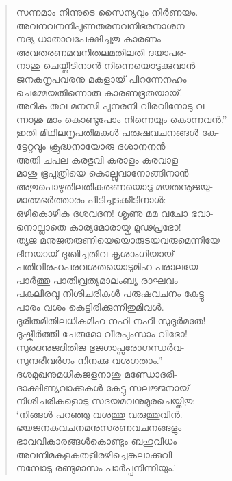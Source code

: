 \begin{verse}
സന്നമാം നിന്നുടെ സൈന്യവും നിര്‍ണയം.\\
അവനവനനിപുണതരനവനിഭരനാശന-\\
നദ്യ ധാതാവപേക്ഷിച്ചതു കാരണം\\
അവതരണമവനിതലമതിലതി ദയാപര-\\
നാശു ചെയ്തീടിനാന്‍ നിന്നെയൊടുക്കുവാന്‍\\
ജനകനൃപവരനു മകളായ് പിറന്നേനഹം\\
ചെമ്മേയതിന്നൊരു കാരണഭൂതയായ്.\\
അറിക തവ മനസി പുനരനി വിരവിനോടു വ-\\
ന്നാശു മാം കൊണ്ടുപോം നിന്നെയും കൊന്നവന്‍.”\\
ഇതി മിഥിലനൃപതിമകള്‍ പരുഷവചനങ്ങള്‍ കേ-\\
ട്ടേറ്റവും ക്രുദ്ധനായോരു ദശാനനന്‍\\
അതി ചപല കരഭുവി കരാളം കരവാള-\\
മാശു ഭൂപുത്രിയെ കൊല്ലുവാനോങ്ങിനാന്‍\\
അതുപൊഴുതിലതികരുണയൊടു മയതനൂജയു-\\
മാത്മഭര്‍ത്താരം പിടിച്ചടക്കീടിനാള്‍:\\
ഒഴികൊഴിക ദശവദന! ശൃണു മമ വചോ ഭവാ-\\
നൊല്ലാതെ കാര്യമോരായ്ക മൂഢപ്രഭോ!\\
ത്യജ മനുജതരുണിയെയൊരുടയവരുമെന്നിയേ\\
ദീനയായ് ദുഃഖിച്ചതീവ കൃശാംഗിയായ്\\
പതിവിരഹപരവശതയൊടുമിഹ പരാലയേ\\
പാര്‍ത്തു പാതിവ്രത്യമാലംബ്യ രാഘവം\\
പകലിരവു നിശിചരികള്‍ പരുഷവചനം കേട്ടു\\
പാരം വശം കെട്ടിരിക്കുന്നിതുമിവള്‍.\\
ദുരിതമിതിലധികമിഹ നഹി നഹി സുദുര്‍മതേ!\\
ദുഷ്കീര്‍ത്തി ചേരുമോ വീരപുംസാം വിഭോ!\\
സുരദനുജദിതിജ ഭുജഗാപ്സരോഗന്ധര്‍വ-\\
സുന്ദരീവര്‍ഗം നിനക്കു വശഗതാം.”\\
ദശമുഖനുമധികജളനാശു മണ്ഡോദരീ-\\
ദാക്ഷിണ്യവാക്കുകള്‍ കേട്ടു സലജ്ജനായ്\\
നിശിചരികളൊടു സദയമവനുമുരചെയ്തിതു:\\
‘നിങ്ങള്‍ പറഞ്ഞു വശത്തു വരുത്തുവിന്‍.\\
ഭയജനകവചനമനുസരണവചനങ്ങളും\\
ഭാവവികാരങ്ങള്‍കൊണ്ടും ബഹുവിധം\\
അവനിമകളകതളിരഴിച്ചെങ്കലാക്കുവി-\\
നമ്പോടു രണ്ടുമാസം പാര്‍പ്പനിന്നിയും.’\\

\end{verse}
